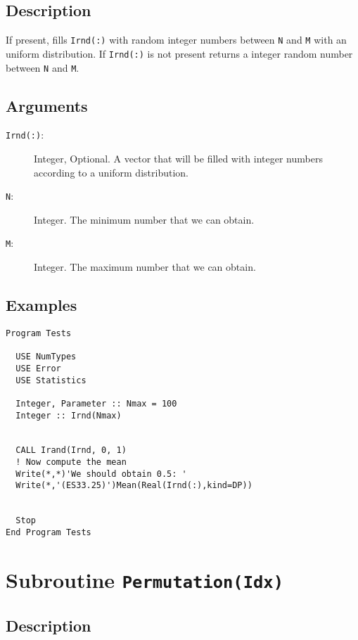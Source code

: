 \subsection{Description}

If present, fills \texttt{Irnd(:)} with random integer numbers between
\texttt{N} and \texttt{M} with an uniform distribution. If
\texttt{Irnd(:)} is not present returns a integer random number
between \texttt{N} and \texttt{M}.

\subsection{Arguments}

\begin{description}
\item[\texttt{Irnd(:)}:] Integer, Optional. A vector that will be
  filled with integer numbers according to a uniform distribution.
\item[\texttt{N}:] Integer. The minimum number that we can obtain.
\item[\texttt{M}:] Integer. The maximum number that we can obtain.
\end{description}

\subsection{Examples}

\begin{lstlisting}[emph=Irand,
                   emphstyle=\color{blue},
                   frame=trBL,
                   caption=Obtaining integer random numbers.,
                   label=irand]
Program Tests

  USE NumTypes
  USE Error
  USE Statistics

  Integer, Parameter :: Nmax = 100
  Integer :: Irnd(Nmax)


  CALL Irand(Irnd, 0, 1)
  ! Now compute the mean 
  Write(*,*)'We should obtain 0.5: '
  Write(*,'(ES33.25)')Mean(Real(Irnd(:),kind=DP))


  Stop
End Program Tests
\end{lstlisting}

\section{Subroutine \texttt{Permutation(Idx)}}

\subsection{Description}

